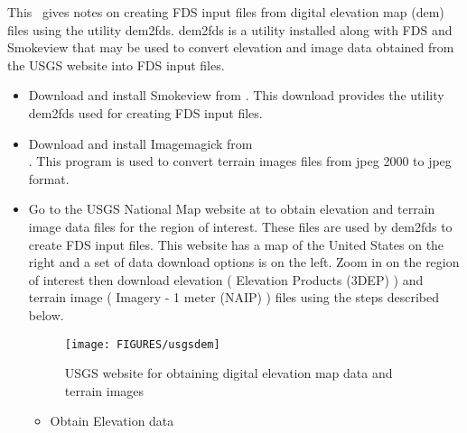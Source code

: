 
This \textchap\ gives notes on creating FDS input files from digital elevation map (dem) files using the utility dem2fds.
dem2fds is a utility installed along with FDS and Smokeview that may be used to convert elevation and image data obtained
from the USGS website  into FDS input files.


\begin{itemize}
\item Download and install Smokeview from .
This download provides the utility dem2fds used for creating FDS input files.

\item Download and install Imagemagick from \\  .
This program is used to convert terrain images files from jpeg 2000 to jpeg format.

\item Go to the USGS National Map website at  to obtain elevation and terrain image data files
for the region of interest.
These files are used by dem2fds to create FDS input files.
This website has a map of the United States on the right and a set of data download options is on the left.
Zoom in on the region of interest then download elevation ( Elevation Products (3DEP) ) and terrain image ( Imagery - 1 meter (NAIP) ) files using the steps described below.

\begin{figure}[bph]
\centerline{
\texttt{[image: FIGURES/usgsdem]}}
 \caption[FDS file overview]{USGS website for obtaining digital elevation map data and terrain images}
\label{usgswebsite}%
\end{figure}

\begin{itemize}
\item Obtain Elevation data


\end{itemize}
\end{itemize}
